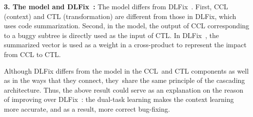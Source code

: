 

{\bf 3. The  model and
  DLFix~\cite{icse20}:} The  model differs from
DLFix~\cite{icse20}. First, CCL (context) and CTL (transformation) are
different from those in DLFix, which uses code summarization. Second,
in the  model, the output of CCL corresponding to a
buggy subtree is directly used as the input of CTL. In
DLFix~\cite{icse20}, the summarized vector is used as a weight in a
cross-product to represent the impact from CCL to CTL.

Although DLFix differs from the  model in the CCL~and
CTL components as well as in the ways that they connect, they~share
the same principle of the cascading architecture. Thus, the above result
could serve as an explanation on the reason of {\tool} improving over
DLFix~\cite{icse20}: the dual-task learning makes the context learning
more accurate, and as a result, more correct bug-fixing.






